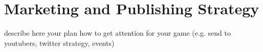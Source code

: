 \chapter{Marketing and Publishing Strategy}

describe here your plan how to get attention for your game (e.g. send to youtubers, twitter strategy, events) 
